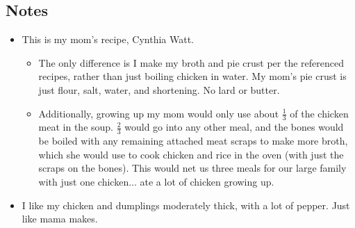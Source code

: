 \begin{multicols}{2}
\subsection*{Notes}
\begin{itemize}
    \item This is my mom's recipe, Cynthia Watt.
    \begin{itemize}
        \item The only difference is I make my broth and pie crust per the referenced recipes, rather than just boiling chicken in water. My mom's pie crust is just flour, salt, water, and shortening. No lard or butter.
        \item Additionally, growing up my mom would only use about \( \frac{1}{3} \) of the chicken meat in the soup. \( \frac{2}{3} \) would go into any other meal, and the bones would be boiled with any remaining attached meat scraps to make more broth, which she would use to cook chicken and rice in the oven (with just the scraps on the bones). This would net us three meals for our large family with just one chicken... ate a lot of chicken growing up.
    \end{itemize}
    \item I like my chicken and dumplings moderately thick, with a lot of pepper. Just like mama makes.
\end{itemize}
\end{multicols}
\clearpage